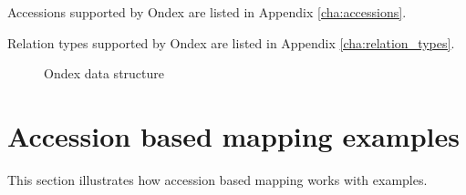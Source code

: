 Accessions supported by Ondex are listed in Appendix \ref{cha:accessions}.

Relation types supported by Ondex are listed in Appendix \ref{cha:relation_types}.

\begin{figure}[H]
\centering
{}
\label{fig:script_concepts_relations}
\caption{Ondex data structure}
\end{figure}

\newpage
\section{Accession based mapping examples}
\label{sec:accmapping_examples}
This section illustrates how accession based mapping works with examples.


